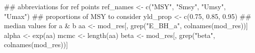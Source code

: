 \documentclass[
  11pt,
]{article}
\newenvironment{Shaded}{}{}
\newcommand{\DocumentationTok}[1]{\textcolor[rgb]{0.00,0.50,0.00}{#1}}
\newcommand{\FloatTok}[1]{#1}
\newcommand{\FunctionTok}[1]{#1}
\newcommand{\NormalTok}[1]{#1}
\newcommand{\OtherTok}[1]{\textcolor[rgb]{1.00,0.25,0.00}{#1}}
\newcommand{\StringTok}[1]{\textcolor[rgb]{0.00,0.50,0.50}{#1}}
\begin{document}
\begin{Shaded}
\begin{Highlighting}[]
\DocumentationTok{\#\# abbreviations for ref points}
\NormalTok{ref\_names }\OtherTok{\textless{}{-}} \FunctionTok{c}\NormalTok{(}\StringTok{"MSY"}\NormalTok{, }\StringTok{"Smsy"}\NormalTok{, }\StringTok{"Umsy"}\NormalTok{, }\StringTok{"Umax"}\NormalTok{)}
\DocumentationTok{\#\# proportions of MSY to consider}
\NormalTok{yld\_prop }\OtherTok{\textless{}{-}} \FunctionTok{c}\NormalTok{(}\FloatTok{0.75}\NormalTok{, }\FloatTok{0.85}\NormalTok{, }\FloatTok{0.95}\NormalTok{)}
\DocumentationTok{\#\# median values for a \& b}
\NormalTok{aa }\OtherTok{\textless{}{-}}\NormalTok{ mod\_res[, }\FunctionTok{grep}\NormalTok{(}\StringTok{"E\_BH\_a"}\NormalTok{, }\FunctionTok{colnames}\NormalTok{(mod\_res))]}
\NormalTok{alpha }\OtherTok{\textless{}{-}} \FunctionTok{exp}\NormalTok{(aa)}
\NormalTok{mcmc }\OtherTok{\textless{}{-}} \FunctionTok{length}\NormalTok{(aa)}
\NormalTok{beta }\OtherTok{\textless{}{-}}\NormalTok{ mod\_res[, }\FunctionTok{grep}\NormalTok{(}\StringTok{"beta"}\NormalTok{, }\FunctionTok{colnames}\NormalTok{(mod\_res))]}


\end{Highlighting}
\end{Shaded}
\end{document}

